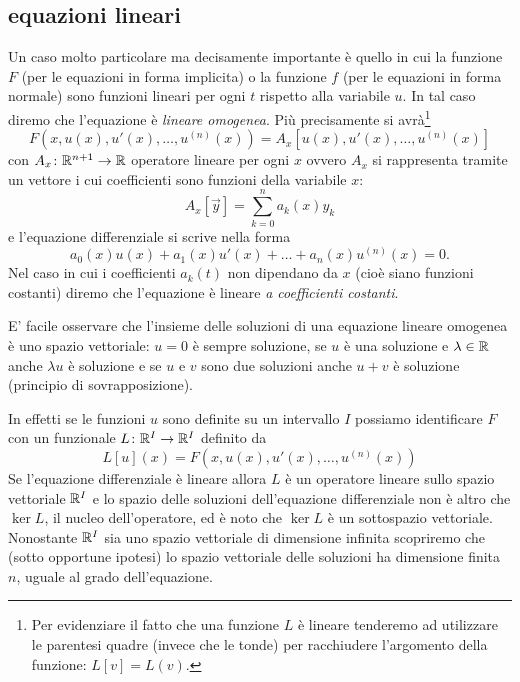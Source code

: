 \subsection{equazioni lineari}

Un caso molto particolare ma decisamente importante è quello in cui la funzione
$F$ (per le equazioni in forma implicita) o la funzione $f$
(per le equazioni in forma normale) sono funzioni lineari
per ogni $t$
rispetto alla variabile $u$.
In tal caso diremo che l'equazione è
%
%
\emph{lineare omogenea}.
Più precisamente si avrà\footnote{%
Per evidenziare il fatto che una funzione $L$ è lineare tenderemo ad utilizzare 
le parentesi quadre (invece che le tonde) per racchiudere l'argomento della 
funzione: $L[v] = L(v)$.
}
\[
F(x,u(x),u'(x), \dots, u^{(n)}(x)) = A_x[u(x), u'(x), \dots, u^{(n)}(x)]
\]
con $A_x\colon {\mathbb R}^{n+1}\to {\mathbb R}$
operatore lineare per ogni $x$ ovvero $A_x$ si rappresenta tramite un vettore
i cui coefficienti sono funzioni della variabile $x$:
\[
  A_x[\vec y] = \sum_{k=0}^n a_k(x) y_k
\]
e l'equazione differenziale si scrive nella forma
\[
  a_0(x) u(x) + a_1(x) u'(x) + \dots + a_n(x) u^{(n)}(x) = 0.
\]
Nel caso in cui i coefficienti $a_k(t)$ non dipendano da $x$
(cioè siano funzioni costanti) diremo che l'equazione è
lineare
%
%
\emph{a coefficienti costanti}.

E' facile osservare che l'insieme delle soluzioni di una equazione lineare 
omogenea è uno spazio vettoriale: $u=0$ è sempre soluzione, 
se $u$ è una soluzione e $\lambda \in {\mathbb R}$ anche $\lambda u$ è soluzione 
e se $u$ e $v$ sono due soluzioni anche $u+v$ è soluzione
%
%
%
(principio di sovrapposizione).

In effetti
se le funzioni $u$ sono definite su un intervallo $I$ possiamo
identificare $F$ con un funzionale $L\colon {\mathbb R}^I \to {\mathbb R}^I$ definito da
\[
  L[u](x) = F(x,u(x), u'(x), \dots, u^{(n)}(x))
\]
Se l'equazione differenziale è lineare allora $L$ è un operatore lineare
sullo spazio vettoriale ${\mathbb R}^I$ e lo spazio delle soluzioni dell'equazione
differenziale non è altro che $\ker L$, il nucleo dell'operatore,
ed è noto che $\ker L$ è un sottospazio vettoriale.
Nonostante ${\mathbb R}^I$ sia uno spazio vettoriale di dimensione infinita scopriremo
che (sotto opportune ipotesi) lo spazio vettoriale delle soluzioni
ha dimensione finita $n$, uguale al grado dell'equazione.

